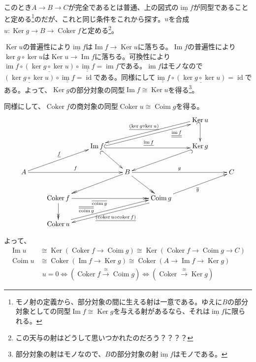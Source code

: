 \documentclass[a4paper,11pt]{jsarticle}
\theoremstyle{definition}
\DeclareMathOperator{\id}{\mathrm{id}}
\DeclareMathOperator{\Ima}{\mathrm{Im}}
\DeclareMathOperator{\im}{\mathrm{im}}
\DeclareMathOperator{\Coker}{\mathrm{Coker}}
\DeclareMathOperator{\coker}{\mathrm{coker}}
\DeclareMathOperator{\Coim}{\mathrm{Coim}}
\DeclareMathOperator{\coim}{\mathrm{coim}}
\DeclareMathOperator{\Ker}{\mathrm{Ker}}
\renewcommand{\ker}{\mathop{\mathrm{ker}}}
\begin{document}
このとき$A\to B\to C$が完全であるとは普通、上の図式の$\underline{\im f}$が同型であることと定める\footnote{モノ射の定義から、部分対象の間に生える射は一意である。ゆえに$B$の部分対象としての同型$\Ima f\cong \Ker g$を与える射があるなら、それは$\underline{\im f}$に限られる。}のだが、これと同じ条件をこれから探す。$u$を合成$u\colon \Ker g\to B\to \Coker f$と定める\footnote{この天与の射はどうして思いつかれたのだろう？？？？}。

$\Ker u$の普遍性により$\underline{\im f}$は$\Ima f\to \Ker u$に落ちる。$\Ima f$の普遍性により$\ker g\circ \ker u$は$\Ker u\to \Ima f$に落ちる。可換性により$\im f\circ \underline{(\ker g\circ\ker u)}\circ \underline{\underline{\im f}}=\im f$である。$\im f$はモノなので$\underline{(\ker g\circ\ker u)}\circ \underline{\underline{\im f}}=\id$である。同様にして$\underline{\underline{\im f}}\circ\underline{(\ker g\circ\ker u)}=\id$である。よって、$\Ker g$の部分対象の同型$\Ima f\cong \Ker u$を得る\footnote{部分対象の射はモノなので、$B$の部分対象の射$\underline{\im f}$はモノである。}。

同様にして、$\Coker f$の商対象の同型$\Coker u\cong \Coim g$を得る。
\[
\xymatrix{
&&&&&\Ker u\ar@{_(->}[d]\ar@<-0.5ex>[dlll]_{\underline{(\ker g\circ\ker u)}}&\\
&&\Ima f\ar@{_(->}[rd]\ar@<-0.5ex>@{^(->}[rrr]^{\underline{\im f}}\ar@<-0.5ex>[urrr]_(0.75){\underline{\underline{\im f}}}&&&\Ker g\ar@{^(->}[lld]&\\
A\ar[rrr]^{f}\ar[urr]^{\underline{f}}&&&B\ar[rrr]^{g}\ar@{->>}[lld]\ar@{->>}[rd]&&&C\\
&\Coker f\ar@{->>}[rrr]_(0.4){\overline{\coim g}}\ar@{->>}[d]&&&\Coim g\ar[urr]_{\overline{g}}\ar@<0.5ex>[dlll]^{\underline{(\coker u\circ \coker f)}}&&\\
&\Coker u\ar@<0.5ex>[urrr]^(0.3){\overline{\overline{\coim g}}}&&&&&
}
\]

よって、\begin{align*}
  \Ima u&\cong \Ker (\Coker f\to \Coim g)\cong \Ker(\Coker f\to \Coim g\to C)\\
  \Coim u&\cong\Coker(\Ima f\to \Ker g)\cong \Coker(A\to \Ima f\to \Ker g)
\end{align*}
\begin{align*}
  u=0\Leftrightarrow(\Coker f\stackrel{\cong}{\to}\Coim g)\Leftrightarrow(\Coker\stackrel{\cong}{\to}\Ker g)
\end{align*}






\end{document}
